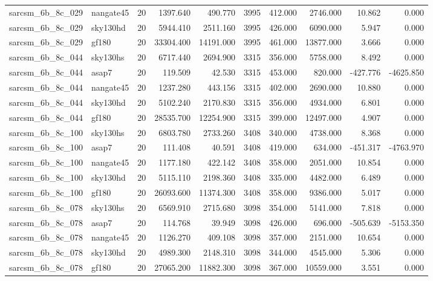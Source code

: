 \documentclass{article}
\begin{document}
\begin{longtable}{llrrrrrrrr}
sarcsm\_6b\_8c\_029 & nangate45 & 20 & 1397.640 & 490.770 & 3995 & 412.000 & 2746.000 & 10.862 & 0.000 \\
sarcsm\_6b\_8c\_029 & sky130hd & 20 & 5944.410 & 2511.160 & 3995 & 426.000 & 6090.000 & 5.947 & 0.000 \\
sarcsm\_6b\_8c\_029 & gf180 & 20 & 33304.400 & 14191.000 & 3995 & 461.000 & 13877.000 & 3.666 & 0.000 \\
sarcsm\_6b\_8c\_044 & sky130hs & 20 & 6717.440 & 2694.900 & 3315 & 356.000 & 5758.000 & 8.492 & 0.000 \\
sarcsm\_6b\_8c\_044 & asap7 & 20 & 119.509 & 42.530 & 3315 & 453.000 & 820.000 & -427.776 & -4625.850 \\
sarcsm\_6b\_8c\_044 & nangate45 & 20 & 1237.280 & 443.156 & 3315 & 402.000 & 2690.000 & 10.880 & 0.000 \\
sarcsm\_6b\_8c\_044 & sky130hd & 20 & 5102.240 & 2170.830 & 3315 & 356.000 & 4934.000 & 6.801 & 0.000 \\
sarcsm\_6b\_8c\_044 & gf180 & 20 & 28535.700 & 12254.900 & 3315 & 399.000 & 12497.000 & 4.907 & 0.000 \\
sarcsm\_6b\_8c\_100 & sky130hs & 20 & 6803.780 & 2733.260 & 3408 & 340.000 & 4738.000 & 8.368 & 0.000 \\
sarcsm\_6b\_8c\_100 & asap7 & 20 & 111.408 & 40.591 & 3408 & 419.000 & 634.000 & -451.317 & -4763.970 \\
sarcsm\_6b\_8c\_100 & nangate45 & 20 & 1177.180 & 422.142 & 3408 & 358.000 & 2051.000 & 10.854 & 0.000 \\
sarcsm\_6b\_8c\_100 & sky130hd & 20 & 5115.110 & 2198.360 & 3408 & 335.000 & 4482.000 & 6.489 & 0.000 \\
sarcsm\_6b\_8c\_100 & gf180 & 20 & 26093.600 & 11374.300 & 3408 & 358.000 & 9386.000 & 5.017 & 0.000 \\
sarcsm\_6b\_8c\_078 & sky130hs & 20 & 6569.910 & 2715.680 & 3098 & 354.000 & 5141.000 & 7.818 & 0.000 \\
sarcsm\_6b\_8c\_078 & asap7 & 20 & 114.768 & 39.949 & 3098 & 426.000 & 696.000 & -505.639 & -5153.350 \\
sarcsm\_6b\_8c\_078 & nangate45 & 20 & 1126.270 & 409.108 & 3098 & 357.000 & 2151.000 & 10.654 & 0.000 \\
sarcsm\_6b\_8c\_078 & sky130hd & 20 & 4989.300 & 2148.310 & 3098 & 344.000 & 4545.000 & 5.306 & 0.000 \\
sarcsm\_6b\_8c\_078 & gf180 & 20 & 27065.200 & 11882.300 & 3098 & 367.000 & 10559.000 & 3.551 & 0.000 \\

\end{longtable}
\end{document}
